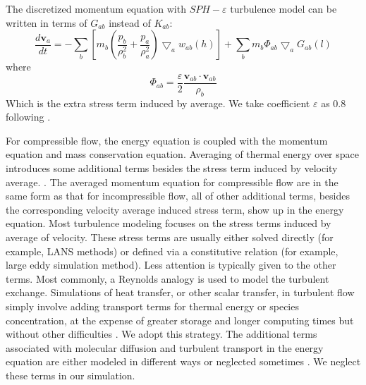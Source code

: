\documentclass[gmd, manuscript]{copernicus} %
\begin{document}
The discretized momentum equation with $SPH-\varepsilon$ turbulence model can be written in terms of $G_{ab}$ instead of $K_{ab}$:
\begin{equation}
\label{eq:SPH-mom-epsilon-turb}
\dfrac{d \textbf{v}_a}{dt} = -\sum_b \left[m_b \left(\dfrac{p_b}{\rho_b^2} + \dfrac{p_a}{\rho_a^2}\right) \bigtriangledown_aw_{a b}\left(h\right)\right] + \sum_b m_b \Phi_{ab}\bigtriangledown_aG_{ab}\left(l\right)
\end{equation}
where 
\begin{equation}
\Phi_{ab}=\dfrac{\varepsilon}{2} \dfrac{\textbf{v}_{ab} \cdot \textbf{v}_{ab}}{\rho_b} 
\end{equation}
Which is the extra stress term induced by average. We take coefficient $\varepsilon$ as 0.8 following \citet{monaghan2011turbulence}.

For compressible flow, the energy equation is coupled with the momentum equation and mass conservation equation. Averaging of thermal energy over space introduces some additional terms besides the stress term induced by velocity average. \citep{NASACompressibleTurbulence}. The averaged momentum equation for compressible flow are in the same form as that for incompressible flow, all of other additional terms, besides the corresponding velocity average induced stress term, show up in the energy equation. Most turbulence modeling focuses on the stress terms induced by average of velocity. These stress terms are usually either solved directly (for example, LANS methods) or defined via a constitutive relation (for example, large eddy simulation method). Less attention is typically given to the other terms. Most commonly, a Reynolds analogy is used to model the turbulent exchange. Simulations of heat transfer, or other scalar transfer, in turbulent flow simply involve adding transport terms for thermal energy or species concentration, at the expense of greater storage and longer computing times but without other difficulties \citep{cebeci2013analysis}. We adopt this strategy. %
The additional terms associated with molecular diffusion and turbulent transport in the energy equation are either modeled in different ways or neglected sometimes \citep{NASACompressibleTurbulence}. We neglect these terms in our simulation.
\end{document}
